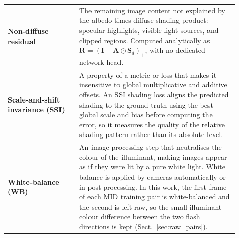 \begin{longtable}{p{0.28\linewidth} p{0.62\linewidth}}
\textbf{Non-diffuse residual}
  & The remaining image content not explained by the albedo-times-diffuse-shading
    product: specular highlights, visible light sources, and clipped regions.
    Computed analytically as $\mathbf{R} = (\mathbf{I} - \mathbf{A} \odot \mathbf{S}_d)_{+}$,
    with no dedicated network head. \\[4pt]

\textbf{Scale-and-shift invariance (SSI)}
  & A property of a metric or loss that makes it insensitive to global
    multiplicative and additive offsets.  An SSI shading loss aligns the
    predicted shading to the ground truth using the best global scale
    and bias before computing the error, so it measures the quality of
    the relative shading pattern rather than its absolute level. \\[4pt]

\textbf{White-balance (WB)}
  & An image processing step that neutralises the colour of the illuminant,
    making images appear as if they were lit by a pure white light.
    White balance is applied by cameras automatically or in post-processing.
    In this work, the first frame of each MID training pair is white-balanced and
    the second is left raw, so the small illuminant colour difference between the
    two flash directions is kept (Sect.~\ref{sec:raw_pairs}). \\[4pt]

\end{longtable}
